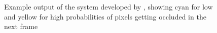 \begin{figure}[htb!]
 \centering
 \caption{Example output of the system developed by , showing cyan for low and yellow for high probabilities of pixels getting occluded in the next frame}
 \label{fig:learningocclusions}
\end{figure}


